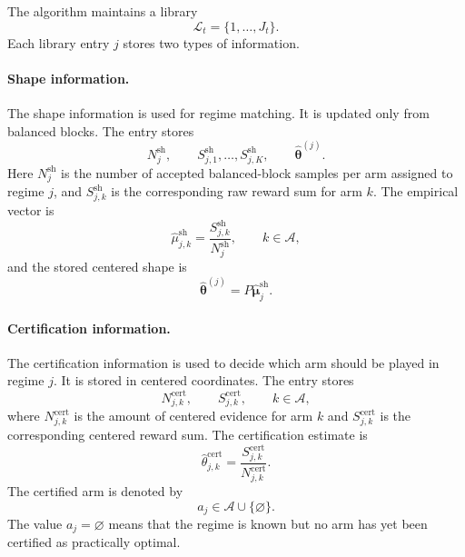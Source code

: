 \documentclass[11pt]{article}
\newcommand{\A}{\mathcal A}
\newcommand{\Lcal}{\mathcal L}
\begin{document}
The algorithm maintains a library
\begin{equation}
    \Lcal_t=\{1,\ldots,J_t\}.
\end{equation}
Each library entry $j$ stores two types of information.

\paragraph{Shape information.}
The shape information is used for regime matching. It is updated only from balanced blocks. The entry stores
\begin{equation}
    N_j^{\mathrm{sh}},
    \qquad
    S_{j,1}^{\mathrm{sh}},\ldots,S_{j,K}^{\mathrm{sh}},
    \qquad
    \widehat{\bm\theta}^{(j)}.
\end{equation}
Here $N_j^{\mathrm{sh}}$ is the number of accepted balanced-block samples per arm assigned to regime $j$, and $S_{j,k}^{\mathrm{sh}}$ is the corresponding raw reward sum for arm $k$. The empirical vector is
\begin{equation}
    \widehat\mu_{j,k}^{\mathrm{sh}}
    =
    \frac{S_{j,k}^{\mathrm{sh}}}{N_j^{\mathrm{sh}}},
    \qquad k\in\A,
\end{equation}
and the stored centered shape is
\begin{equation}
    \widehat{\bm\theta}^{(j)}
    =
    P\widehat{\bm\mu}_{j}^{\mathrm{sh}}.
    \label{eq:library-shape}
\end{equation}

\paragraph{Certification information.}
The certification information is used to decide which arm should be played in regime $j$. It is stored in centered coordinates. The entry stores
\begin{equation}
    N_{j,k}^{\mathrm{cert}},
    \qquad
    S_{j,k}^{\mathrm{cert}},
    \qquad k\in\A,
\end{equation}
where $N_{j,k}^{\mathrm{cert}}$ is the amount of centered evidence for arm $k$ and $S_{j,k}^{\mathrm{cert}}$ is the corresponding centered reward sum. The certification estimate is
\begin{equation}
    \widehat\theta_{j,k}^{\mathrm{cert}}
    =
    \frac{S_{j,k}^{\mathrm{cert}}}{N_{j,k}^{\mathrm{cert}}}.
    \label{eq:cert-estimate}
\end{equation}
The certified arm is denoted by
\begin{equation}
    a_j\in\A\cup\{\varnothing\}.
\end{equation}
The value $a_j=\varnothing$ means that the regime is known but no arm has yet been certified as practically optimal.
\end{document}

